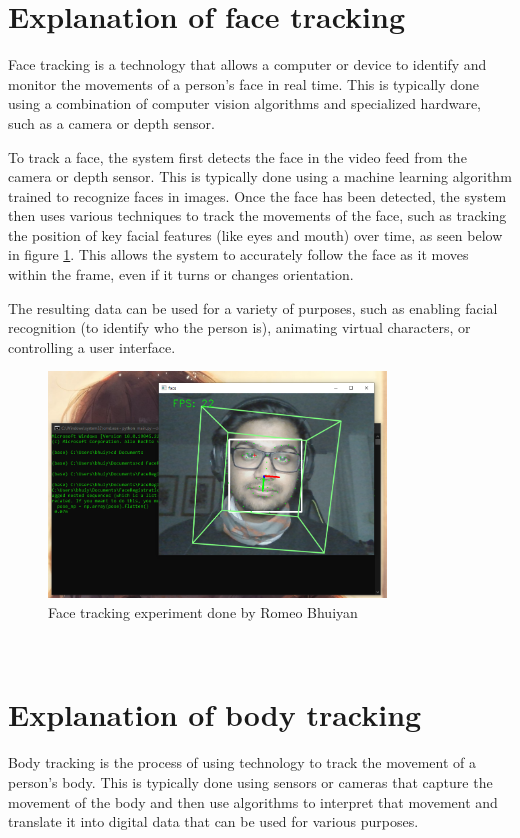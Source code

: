 \section{Explanation of face tracking}
Face tracking is a technology that allows a computer or device to identify
and monitor the movements of a person's face in real time. 
This is typically done using a combination of computer vision 
algorithms and specialized hardware, such as a camera or depth sensor. \cite{book2}

To track a face, the system first detects the face in 
the video feed from the camera or depth sensor. This is 
typically done using a machine learning algorithm trained to 
recognize faces in images. Once the face has been detected, 
the system then uses various techniques to track the movements 
of the face, such as tracking the position of key facial features
(like eyes and mouth) over time, as seen below in figure \ref{fig:facetracking}.
 This allows the system to accurately follow the face as it moves within the frame, even if it 
turns or changes orientation.

The resulting data can be used for a variety of 
purposes, such as enabling facial recognition 
(to identify who the person is), animating virtual characters, 
or controlling a user interface.
\\
\begin{figure}[htb]
    \centering
    \includegraphics[width=0.8\textwidth]{pics/bhuiyanfracetracking.png}
    \caption{Face tracking experiment done by Romeo Bhuiyan}
    \label{fig:facetracking}
\end{figure}
\\
\section{Explanation of body tracking}
Body tracking is the process of using technology to track the movement of a person's body.
This is typically done using sensors or cameras that capture the movement of the body and 
then use algorithms to interpret that movement and translate it into digital data that can 
be used for various purposes. 

